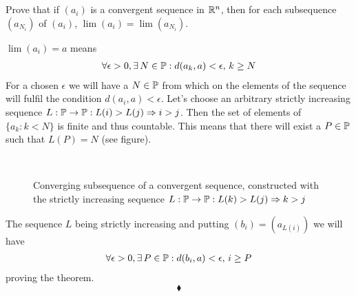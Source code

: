 \subsection{}
\begin{tcolorbox}
Prove that if $(a_i)$ is a convergent sequence in $\mathbb{R}^n$, then for each
subsequence $(a_{N_i})$ of $(a_i)$, $\lim (a_i) = \lim (a_{N_i})$.
\end{tcolorbox}
$\lim (a_i) = a$ means
\begin{align*}
\forall\epsilon >0,\exists\, N\in \mathbb{P}: d(a_k,a)<\epsilon,\, k\geq N
\end{align*}
For a chosen $\epsilon$ we will have a $N\in\mathbb{P}$ from which on the elements of the sequence will fulfil the condition $d(a_i,a)<\epsilon$. Let's choose an arbitrary strictly increasing sequence $L:\mathbb{P} \rightarrow\mathbb{P}: L(i)>L(j)\Rightarrow i>j$. Then the set of elements of $\{a_k:k<N\}$ is finite and thus countable. This means that there will exist a $P\in \mathbb{P}$ such that $L(P)=N$ (see figure).   
\begin{figure}[H]%
    \centering
\\
\caption{Converging subsequence of a convergent sequence, constructed with the strictly increasing sequence $L:\mathbb{P} \rightarrow\mathbb{P}: L(k)>L(j)\Rightarrow k>j$}
\label{fig:fig_p8a}
\end{figure}
The sequence $L$ being strictly increasing and putting $(b_i)=(a_{L(i)})$ we will have 
\begin{align*}
\forall\epsilon >0,\exists\, P\in \mathbb{P}: d(b_i,a)<\epsilon,\, i\geq P
\end{align*}
proving the theorem.
$$\blacklozenge$$\\

\newpage


